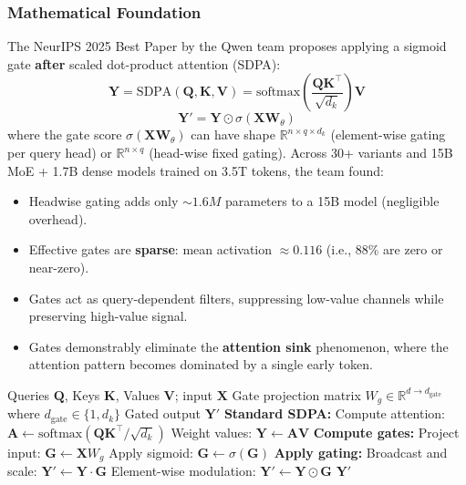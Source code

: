 \subsubsection{Mathematical Foundation}

The NeurIPS 2025 Best Paper by the Qwen team proposes applying a sigmoid gate \textbf{after} scaled dot-product attention (SDPA):
\[
\mathbf{Y} = \text{SDPA}(\mathbf{Q}, \mathbf{K}, \mathbf{V}) = \text{softmax}\left(\frac{\mathbf{Q}\mathbf{K}^\top}{\sqrt{d_k}}\right) \mathbf{V}
\]
\[
\mathbf{Y}' = \mathbf{Y} \odot \sigma\left(\mathbf{X} \mathbf{W}_\theta\right)
\]
where the gate score $\sigma(\mathbf{X} \mathbf{W}_\theta)$ can have shape $\mathbb{R}^{n \times q \times d_k}$ (element-wise gating per query head) or $\mathbb{R}^{n \times q}$ (head-wise fixed gating). Across 30+ variants and 15B MoE + 1.7B dense models trained on 3.5T tokens, the team found:

\begin{itemize}[leftmargin=*]
    \item Headwise gating adds only $\sim 1.6M$ parameters to a 15B model (negligible overhead).
    \item Effective gates are \textbf{sparse}: mean activation $\approx 0.116$ (i.e., 88\% are zero or near-zero).
    \item Gates act as query-dependent filters, suppressing low-value channels while preserving high-value signal.
    \item Gates demonstrably eliminate the \textbf{attention sink} phenomenon, where the attention pattern becomes dominated by a single early token.
\end{itemize}

\begin{algorithm}[H]
\caption{Gated Softmax Attention (Post-SDPA)}
\begin{algorithmic}[1]
\Require Queries $\mathbf{Q}$, Keys $\mathbf{K}$, Values $\mathbf{V}$; input $\mathbf{X}$
\Require Gate projection matrix $W_g \in \mathbb{R}^{d \to d_{\text{gate}}}$ where $d_{\text{gate}} \in \{1, d_k\}$
\Ensure Gated output $\mathbf{Y}'$
\State \textbf{Standard SDPA:}
\State Compute attention: $\mathbf{A} \gets \text{softmax}(\mathbf{Q}\mathbf{K}^\top / \sqrt{d_k})$ 
\State Weight values: $\mathbf{Y} \gets \mathbf{A} \mathbf{V}$
\State \textbf{Compute gates:}
\State Project input: $\mathbf{G} \gets \mathbf{X} W_g$  
\State Apply sigmoid: $\mathbf{G} \gets \sigma(\mathbf{G})$ 
\State \textbf{Apply gating:}
    \State Broadcast and scale: $\mathbf{Y}' \gets \mathbf{Y} \cdot \mathbf{G}$ 
\Else
    \State Element-wise modulation: $\mathbf{Y}' \gets \mathbf{Y} \odot \mathbf{G}$ 
\EndIf
\Return $\mathbf{Y}'$
\end{algorithmic}
\end{algorithm}

